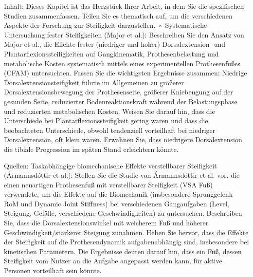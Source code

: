 Inhalt: Dieses Kapitel ist das Herzstück Ihrer Arbeit, in dem Sie die spezifischen Studien zusammenfassen. Teilen Sie es thematisch auf, um die verschiedenen Aspekte der Forschung zur Steifigkeit darzustellen.
◦
Systematische Untersuchung fester Steifigkeiten (Major et al.): Beschreiben Sie den Ansatz von Major et al., die Effekte fester (niedriger und hoher) Dorsalextension- und Plantarflexionssteifigkeiten auf Gangkinematik, Prothesenbelastung und metabolische Kosten systematisch mittels eines experimentellen Prothesenfußes (CFAM) untersuchten. Fassen Sie die wichtigsten Ergebnisse zusammen: Niedrige Dorsalextensionsteifigkeit führte im Allgemeinen zu größerer Dorsalextensionsbewegung der Prothesenseite, größerer Kniebeugung auf der gesunden Seite, reduzierter Bodenreaktionskraft während der Belastungsphase und reduzierten metabolischen Kosten. Weisen Sie darauf hin, dass die Unterschiede bei Plantarflexionssteifigkeit gering waren und dass die beobachteten Unterschiede, obwohl tendenziell vorteilhaft bei niedriger Dorsalextension, oft klein waren. Erwähnen Sie, dass niedrigere Dorsalextension die tibiale Progression im späten Stand erleichtern könnte.

Quellen:
Taskabhängige biomechanische Effekte verstellbarer Steifigkeit (Ármannsdóttir et al.): Stellen Sie die Studie von Ármannsdóttir et al. vor, die einen neuartigen Prothesenfuß mit verstellbarer Steifigkeit (VSA Fuß) verwendete, um die Effekte auf die Biomechanik (insbesondere Sprunggelenk RoM und Dynamic Joint Stiffness) bei verschiedenen Gangaufgaben (Level, Steigung, Gefälle, verschiedene Geschwindigkeiten) zu untersuchen. Beschreiben Sie, dass die Dorsalextensionswinkel mit weicherem Fuß und höherer Geschwindigkeit/stärkerer Steigung zunahmen. Heben Sie hervor, dass die Effekte der Steifigkeit auf die Prothesendynamik aufgabenabhängig sind, insbesondere bei kinetischen Parametern. Die Ergebnisse deuten darauf hin, dass ein Fuß, dessen Steifigkeit vom Nutzer an die Aufgabe angepasst werden kann, für aktive Personen vorteilhaft sein könnte.

